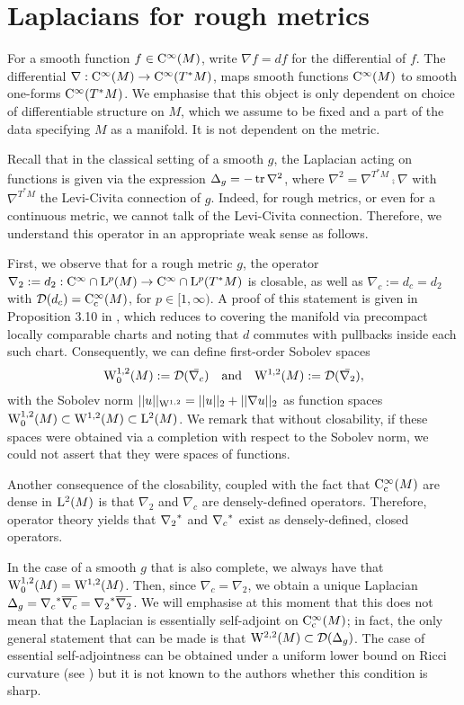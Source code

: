 \documentclass[a4paper, 12pt]{amsart}
\begin{document}
\section{Laplacians for rough metrics}


For a smooth function \(f \in \Ck{\infty}(M)\), write \(\nabla f = df\) for the differential of \(f\). 
The differential \(\nabla : \Ck{\infty}(M) \to \Ck{\infty}(T^{\ast} M)\), maps smooth functions 
\(\Ck{\infty}(M)\) to smooth one-forms \(\Ck{\infty}(T^{\ast} M)\). 
We emphasise that this object is only dependent on choice of differentiable structure on $M$,
which we assume to be fixed and a part of the data specifying $M$ as a manifold. 
It is not dependent on the metric.

Recall that in the classical setting of a smooth $g$,  the Laplacian acting on functions 
is given  via the expression $\Delta_g = - \tr \nabla^2$, where $\nabla^2 = \nabla^{T^\ast M} \comp \nabla$
with $\nabla^{T^\ast M}$ the Levi-Civita connection of $g$. Indeed, for rough metrics, 
or even for a continuous metric, we cannot talk of the Levi-Civita connection. 
Therefore, we understand this operator in an appropriate weak sense as follows.

First, we observe that for a rough metric $g$, the operator
$\nabla_2 := d_2: \Ck{\infty} \cap \Lp{p}(M) \to \Ck{\infty} \cap \Lp{p}(T^\ast M)$
is closable, as well as $\nabla_c := d_c = d_2$ with $\dom(d_c) = \Ck[c]{\infty}(M)$,
for $p \in [1, \infty)$. A proof of this statement is given in Proposition 3.10 in \cite{BRough}, 
which reduces to covering the manifold via precompact locally comparable
charts and noting that $d$ commutes with pullbacks inside each such chart. 
Consequently, we can define first-order Sobolev spaces
$$ \SobH[0]{1}(M) := \dom(\bar{\nabla_c})\quad \text{and}\quad  \SobH{1}(M) := \dom(\bar{\nabla_2}),$$
with the Sobolev norm $||u||_{\SobH{1}} = ||u||_2 + ||\nabla u||_2$
as function spaces $\SobH[0]{1}(M) \subset \SobH{1}(M) \subset \Lp{2}(M)$.
We remark that without closability, if these spaces were obtained
via a completion with respect to the Sobolev norm, we could not 
assert that they were spaces of functions.

Another consequence of the closability, coupled with the 
fact that $\Ck[c]{\infty}(M)$ are dense in $\Lp{2}(M)$ 
is that $\nabla_2$ and $\nabla_c$ are densely-defined
operators. Therefore, operator theory yields 
that $\adj{\nabla_2}$ and $\adj{\nabla_c}$ exist
as densely-defined, closed operators.


In the case of a smooth $g$ that is also complete, we
always have that $\SobH[0]{1}(M) = \SobH{1}(M)$. 
Then, since $\nabla_c = \nabla_2$, we obtain 
a unique Laplacian $\Delta_g = \adj{\nabla_c} \close{\nabla_c} = \adj{\nabla_2}\close{\nabla_2}$.
We will emphasise at this moment that this does not mean that 
the Laplacian is essentially self-adjoint on $\Ck[c]{\infty}(M)$; in 
fact, the only general statement that can be made is that
$\SobH{2}(M) \subset \dom(\Delta_g)$. The 
case of essential self-adjointness can
be obtained under a uniform lower bound on Ricci
curvature (see \cite{BDensity}) but it
is not known to the authors whether this condition is sharp.
\end{document}
